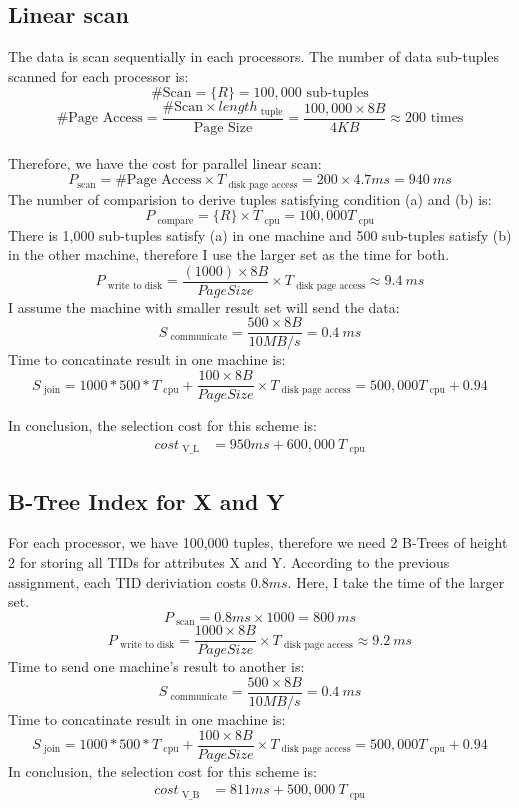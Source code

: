 \documentclass[a4paper,12pt]{article}
\begin{document}
\subsection{Linear scan}
The data is scan sequentially in each processors. The number of data sub-tuples scanned for each processor is:
$$ \#\mbox{Scan} = \{R\} = 100,000 \mbox{ sub-tuples}$$
$$ \#\mbox{Page Access} = \frac{\#\mbox{Scan} \times length_{\mbox{ tuple}}}{\mbox{Page Size}} = \frac{100,000 \times 8B}{4KB} \approx 200 \mbox{ times} $$ \\[0.3em]
Therefore, we have the cost for parallel linear scan:
$$ P_{\mbox{scan}} = \#\mbox{Page Access} \times T_{\mbox{ disk page access}} = 200 \times 4.7ms = 940\ ms $$
The number of comparision to derive tuples satisfying condition (a) and (b) is: 
$$ P_{\mbox{ compare}} = \{R\} \times T_{\mbox{ cpu}} = 100,000 T_{\mbox{ cpu}} $$
There is 1,000 sub-tuples satisfy (a) in one machine and 500 sub-tuples satisfy (b) in the other machine, therefore I use the larger set as the time for both.
$$ P_{\mbox{ write to disk}} = \frac{(1000) \times 8B}{Page Size} \times T_{\mbox{ disk page access}} \approx 9.4\ ms $$ 
I assume the machine with smaller result set will send the data:
$$ S_{\mbox{ communicate}} = \frac{500 \times 8B}{10MB/s} = 0.4\ ms $$
Time to concatinate result in one machine is:
$$ S_{\mbox{ join}} = 1000 * 500 * T_{\mbox{ cpu}} + \frac{100 \times 8B}{Page Size} \times T_{\mbox{ disk page access}} = 500,000 T_{\mbox{ cpu}} + 0.94 $$

In conclusion, the selection cost for this scheme is:
\begin{equation*}
\begin{aligned}
cost_{\mbox{ V\_L}} &= 950ms + 600,000\ T_{\mbox{ cpu}}
\end{aligned}
\end{equation*}

\subsection{B-Tree Index for X and Y}
For each processor, we have 100,000 tuples, therefore we need 2 B-Trees of height 2 for storing all TIDs for attributes X and Y. According to the previous assignment, each TID deriviation costs $0.8ms$. Here, I take the time of the larger set.
$$ P_{\mbox{ scan}} = 0.8ms \times 1000 = 800\ ms $$ 
$$ P_{\mbox{ write to disk}} = \frac{1000 \times 8B}{Page Size} \times T_{\mbox{ disk page access}} \approx 9.2\ ms $$  
Time to send one machine's result to another is:
$$ S_{\mbox{ communicate}} = \frac{500 \times 8B}{10MB/s} = 0.4\ ms $$ 
Time to concatinate result in one machine is:
$$ S_{\mbox{ join}} = 1000 * 500 * T_{\mbox{ cpu}} + \frac{100 \times 8B}{Page Size} \times T_{\mbox{ disk page access}} = 500,000 T_{\mbox{ cpu}} + 0.94 $$
In conclusion, the selection cost for this scheme is:
\begin{equation*}
\begin{aligned}
cost_{\mbox{ V\_B}} &= 811ms + 500,000\ T_{\mbox{ cpu}}
\end{aligned}
\end{equation*}
\end{document}
